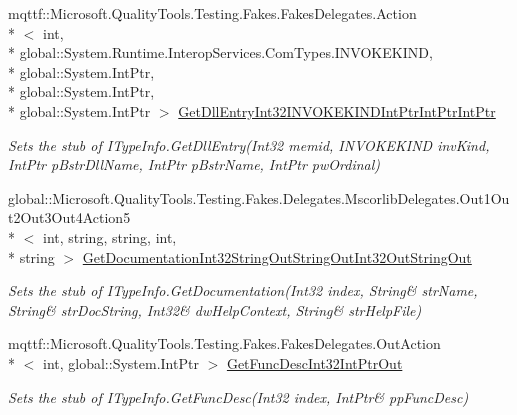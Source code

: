 \begin{DoxyCompactItemize}
mqttf\-::\-Microsoft.\-Quality\-Tools.\-Testing.\-Fakes.\-Fakes\-Delegates.\-Action\\*
$<$ int, \\*
global\-::\-System.\-Runtime.\-Interop\-Services.\-Com\-Types.\-I\-N\-V\-O\-K\-E\-K\-I\-N\-D, \\*
global\-::\-System.\-Int\-Ptr, \\*
global\-::\-System.\-Int\-Ptr, \\*
global\-::\-System.\-Int\-Ptr $>$ \hyperlink{class_system_1_1_runtime_1_1_interop_services_1_1_com_types_1_1_fakes_1_1_stub_i_type_info_a9c929c44ed05b1d45d86a593786cd7a3}{Get\-Dll\-Entry\-Int32\-I\-N\-V\-O\-K\-E\-K\-I\-N\-D\-Int\-Ptr\-Int\-Ptr\-Int\-Ptr}
\begin{DoxyCompactList}\small\item\em Sets the stub of I\-Type\-Info.\-Get\-Dll\-Entry(\-Int32 memid, I\-N\-V\-O\-K\-E\-K\-I\-N\-D inv\-Kind, Int\-Ptr p\-Bstr\-Dll\-Name, Int\-Ptr p\-Bstr\-Name, Int\-Ptr pw\-Ordinal)\end{DoxyCompactList}\item 
global\-::\-Microsoft.\-Quality\-Tools.\-Testing.\-Fakes.\-Delegates.\-Mscorlib\-Delegates.\-Out1\-Out2\-Out3\-Out4\-Action5\\*
$<$ int, string, string, int, \\*
string $>$ \hyperlink{class_system_1_1_runtime_1_1_interop_services_1_1_com_types_1_1_fakes_1_1_stub_i_type_info_a70b21d99d456fdb2e6b52dcda555a6f5}{Get\-Documentation\-Int32\-String\-Out\-String\-Out\-Int32\-Out\-String\-Out}
\begin{DoxyCompactList}\small\item\em Sets the stub of I\-Type\-Info.\-Get\-Documentation(Int32 index, String\& str\-Name, String\& str\-Doc\-String, Int32\& dw\-Help\-Context, String\& str\-Help\-File)\end{DoxyCompactList}\item 
mqttf\-::\-Microsoft.\-Quality\-Tools.\-Testing.\-Fakes.\-Fakes\-Delegates.\-Out\-Action\\*
$<$ int, global\-::\-System.\-Int\-Ptr $>$ \hyperlink{class_system_1_1_runtime_1_1_interop_services_1_1_com_types_1_1_fakes_1_1_stub_i_type_info_a9581af9550341f034250db278f106de3}{Get\-Func\-Desc\-Int32\-Int\-Ptr\-Out}
\begin{DoxyCompactList}\small\item\em Sets the stub of I\-Type\-Info.\-Get\-Func\-Desc(Int32 index, Int\-Ptr\& pp\-Func\-Desc)\end{DoxyCompactList}\item 

\end{DoxyCompactItemize}
